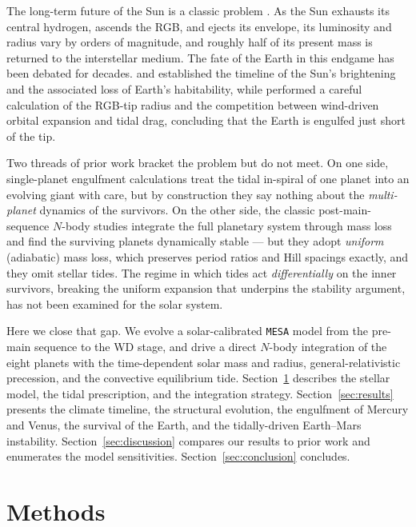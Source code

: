 \documentclass[twocolumn]{aastex631}
\newcommand{\code}[1]{\texttt{#1}}
\begin{document}
The long-term future of the Sun is a classic problem
\citep{SBK1993,Rybicki2001,Schroder2008}. As the Sun exhausts its central
hydrogen, ascends the RGB, and ejects its envelope, its luminosity and radius vary
by orders of magnitude, and roughly half of its present mass is returned to the
interstellar medium. The fate of the Earth in this endgame has been debated for
decades. \citet{SBK1993} and \citet{Rybicki2001} established the timeline of the
Sun's brightening and the associated loss of Earth's habitability, while
\citet{Schroder2008} performed a careful calculation of the RGB-tip radius and the
competition between wind-driven orbital expansion and tidal drag, concluding that
the Earth is engulfed just short of the tip.

Two threads of prior work bracket the problem but do not meet. On one side,
single-planet engulfment calculations \citep{Rasio1996,Villaver2009,Mustill2012,
Schroder2008} treat the tidal in-spiral of one planet into an evolving giant with
care, but by construction they say nothing about the \emph{multi-planet} dynamics of
the survivors. On the other side, the classic post-main-sequence $N$-body studies
\citep{DuncanLissauer1998,Veras2016} integrate the full planetary system through
mass loss and find the surviving planets dynamically stable --- but they adopt
\emph{uniform} (adiabatic) mass loss, which preserves period ratios and Hill
spacings exactly, and they omit stellar tides. The regime in which tides act
\emph{differentially} on the inner survivors, breaking the uniform expansion that
underpins the stability argument, has not been examined for the solar system.

Here we close that gap. We evolve a solar-calibrated \code{MESA} model
\citep{Paxton2011,Paxton2019} from the pre-main sequence to the WD stage, and drive
a direct $N$-body integration of the eight planets with the time-dependent solar
mass and radius, general-relativistic precession, and the convective equilibrium
tide. Section~\ref{sec:methods} describes the stellar model, the tidal
prescription, and the integration strategy. Section~\ref{sec:results} presents the
climate timeline, the structural evolution, the engulfment of Mercury and Venus,
the survival of the Earth, and the tidally-driven Earth--Mars instability.
Section~\ref{sec:discussion} compares our results to prior work and enumerates the
model sensitivities. Section~\ref{sec:conclusion} concludes.

\section{Methods}
\label{sec:methods}
\end{document}
